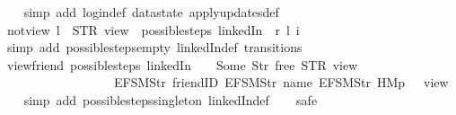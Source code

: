 \begin{isabellebody}
%
\isadelimproof
\ \ %
\endisadelimproof
%
\isatagproof
{}\isamarkupfalse%
\ {\isacharparenleft}simp\ add{\isacharcolon}\ login{\isacharunderscore}def\ datastate\ apply{\isacharunderscore}updates{\isacharunderscore}def{\isacharparenright}%
\endisatagproof
{\isafoldproof}%
%
\isadelimproof
\isanewline
%
\endisadelimproof
\isanewline
{}\isamarkupfalse%
\ not{\isacharunderscore}view{\isacharunderscore}{}{\isacharcolon}\ {\isachardoublequoteopen}l\ {\isasymnoteq}\ STR\ {\isacharprime}{\isacharprime}view{\isacharprime}{\isacharprime}\ {\isasymLongrightarrow}\ possible{\isacharunderscore}steps\ linkedIn\ {}\ r\ l\ i\ {\isacharequal}\ {\isacharbraceleft}{\isacharbar}{\isacharbar}{\isacharbraceright}{\isachardoublequoteclose}\isanewline
%
\isadelimproof
\ \ %
\endisadelimproof
%
\isatagproof
{}\isamarkupfalse%
\ {\isacharparenleft}simp\ add{\isacharcolon}\ possible{\isacharunderscore}steps{\isacharunderscore}empty\ linkedIn{\isacharunderscore}def\ transitions{\isacharparenright}%
\endisatagproof
{\isafoldproof}%
%
\isadelimproof
\isanewline
%
\endisadelimproof
\isanewline
{}\isamarkupfalse%
\ view{\isacharunderscore}friend{\isacharcolon}\ {\isachardoublequoteopen}possible{\isacharunderscore}steps\ linkedIn\ {}\ {\isacharparenleft}{\isacharless}{\isachargreater}{\isacharparenleft}{}\ {\isachardollar}{\isacharcolon}{\isacharequal}\ Some\ {\isacharparenleft}Str\ {\isacharprime}{\isacharprime}free{\isacharprime}{\isacharprime}{\isacharparenright}{\isacharparenright}{\isacharparenright}\ STR\ {\isacharprime}{\isacharprime}view{\isacharprime}{\isacharprime}\isanewline
\ \ \ \ \ \ \ \ \ \ \ \ \ \ \ \ \ \ {\isacharbrackleft}EFSM{\isachardot}Str\ {\isacharprime}{\isacharprime}friendID{\isacharprime}{\isacharprime}{\isacharcomma}\ EFSM{\isachardot}Str\ {\isacharprime}{\isacharprime}name{\isacharprime}{\isacharprime}{\isacharcomma}\ EFSM{\isachardot}Str\ {\isacharprime}{\isacharprime}HM{}p{\isacharprime}{\isacharprime}{\isacharbrackright}\ {\isacharequal}\ {\isacharbraceleft}{\isacharbar}{\isacharparenleft}{}{\isacharcomma}\ view{\isacharparenright}{\isacharbar}{\isacharbraceright}{\isachardoublequoteclose}\isanewline
%
\isadelimproof
\ \ %
\endisadelimproof
%
\isatagproof
{}\isamarkupfalse%
\ {\isacharparenleft}simp\ add{\isacharcolon}\ possible{\isacharunderscore}steps{\isacharunderscore}singleton\ linkedIn{\isacharunderscore}def{\isacharparenright}\isanewline
\ \ \isamarkupfalse%
\ safe\isanewline
\ \ \isamarkupfalse%

\end{isabellebody}
